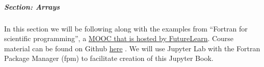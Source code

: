 \subparagraph{Section: Arrays}

In this section we will be following along with the examples from ``Fortran for scientific programming'', a \href{https://www.futurelearn.com/courses/fortran-for-scientific-computing}{MOOC that is hosted by FutureLearn}.  Course material can be found on Github \href{https://github.com/gjbex/Fortran-MOOC}{here} . We will use Jupyter Lab with the Fortran Package Manager (fpm) to facilitate creation of this Jupyter Book.